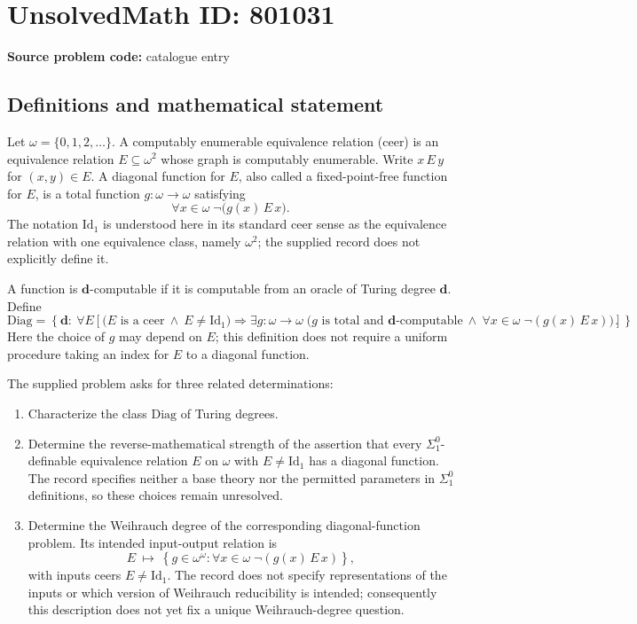 \documentclass[11pt]{article}
\begin{document}
\section*{UnsolvedMath ID: 801031}
\textbf{Source problem code:} catalogue entry
\subsection{Definitions and mathematical statement}
Let \(\omega=\{0,1,2,\ldots\}\). A computably enumerable equivalence relation (ceer) is an equivalence relation \(E\subseteq\omega^2\) whose graph is computably enumerable. Write \(x\,E\,y\) for \((x,y)\in E\). A diagonal function for \(E\), also called a fixed-point-free function for \(E\), is a total function \(g:\omega\to\omega\) satisfying
\[
\forall x\in\omega\;\neg\bigl(g(x)\,E\,x\bigr).
\]
The notation \(\mathrm{Id}_1\) is understood here in its standard ceer sense as the equivalence relation with one equivalence class, namely \(\omega^2\); the supplied record does not explicitly define it.

A function is \(\mathbf d\)-computable if it is computable from an oracle of Turing degree \(\mathbf d\). Define
\[
\mathrm{Diag}=\left\{\mathbf d:\ \forall E\left[\bigl(E\text{ is a ceer}\ \land\ E\ne\mathrm{Id}_1\bigr)\Longrightarrow\exists g:\omega\to\omega\;\bigl(g\text{ is total and }\mathbf d\text{-computable}\ \land\ \forall x\in\omega\;\neg(g(x)\,E\,x)\bigr)\right]\right\}.
\]
Here the choice of \(g\) may depend on \(E\); this definition does not require a uniform procedure taking an index for \(E\) to a diagonal function.

The supplied problem asks for three related determinations:
\begin{enumerate}
\item Characterize the class \(\mathrm{Diag}\) of Turing degrees.
\item Determine the reverse-mathematical strength of the assertion that every \(\Sigma^0_1\)-definable equivalence relation \(E\) on \(\omega\) with \(E\ne\mathrm{Id}_1\) has a diagonal function. The record specifies neither a base theory nor the permitted parameters in \(\Sigma^0_1\) definitions, so these choices remain unresolved.
\item Determine the Weihrauch degree of the corresponding diagonal-function problem. Its intended input-output relation is
\[
E\ \longmapsto\ \left\{g\in\omega^\omega:\forall x\in\omega\;\neg(g(x)\,E\,x)\right\},
\]
with inputs ceers \(E\ne\mathrm{Id}_1\). The record does not specify representations of the inputs or which version of Weihrauch reducibility is intended; consequently this description does not yet fix a unique Weihrauch-degree question.
\end{enumerate}
\end{document}
